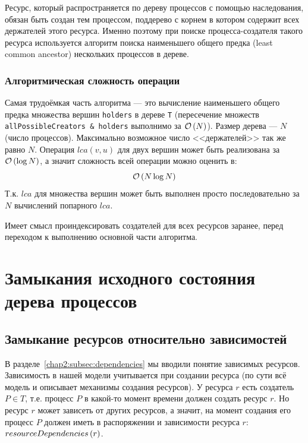 Ресурс, который распространяется по дереву процессов с помощью наследования, обязан быть создан тем процессом,
поддерево с корнем в котором содержит всех держателей этого ресурса. Именно поэтому при поиске процесса-создателя
такого ресурса используется алгоритм поиска наименьшего общего предка (least common ancestor) нескольких процессов в дереве.

\subsubsection*{Алгоритмическая сложность операции}

Самая трудоёмкая часть алгоритма --- это вычисление наименьшего общего предка множества вершин \texttt{holders} в дереве \texttt{T} (пересечение множеств \texttt{allPossibleCreators \& holders} выполнимо за $\mathcal{O}\left(N\right)$). Размер дерева --- $N$ (число процессов). Максимально возможное число <<держателей>> так же равно $N$. Операция $lca(v, u)$ для двух вершин может быть реализована за $\mathcal{O}\left(\log{N}\right)$, а значит сложность всей операции можно оценить в:
\begin{equation}
\mathcal{O}\left(N\log{N}\right)
\end{equation}
Т.к. $lca$ для множества вершин может быть выполнен просто последовательно за $N$ вычислений попарного $lca$.

Имеет смысл проиндексировать создателей для всех ресурсов заранее, перед переходом к выполнению основной части алгоритма.

\section{Замыкания исходного состояния дерева процессов}
\label{chap2:sec:closures}

\subsection{Замыкание ресурсов относительно зависимостей}

В разделе~\ref{chap2:subsec:dependencies} мы вводили понятие зависимых ресурсов. Зависимость в нашей модели учитывается при создании ресурса (по сути всё модель и описывает механизмы создания ресурсов). У ресурса $r$ есть создатель $P \in T$, т.е. процесс $P$ в какой-то момент времени должен создать ресурс $r$. Но ресурс $r$ может зависеть от других ресурсов, а значит, на момент создания его процесс $P$ должен иметь в распоряжении и зависимости ресурса $r$: $resourceDependencies\left( r \right)$.

